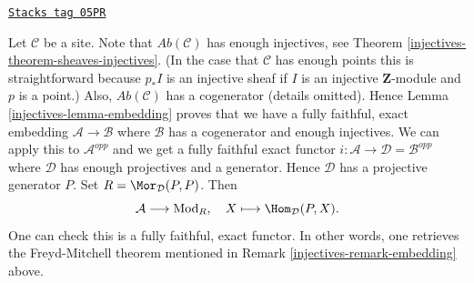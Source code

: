 \begin{remark}
\label{injectives-remark-embedding-freyd}
\href{https://stacks.math.columbia.edu/tag/05PR}{\texttt{Stacks tag 05PR}}

Let $\mathcal{C}$ be a site.
Note that $\textit{Ab}(\mathcal{C})$ has enough injectives, see
Theorem \ref{injectives-theorem-sheaves-injectives}.
(In the case that $\mathcal{C}$ has enough points this is straightforward
because  $p_*I$ is an injective sheaf if $I$ is an injective
$\mathbf{Z}$-module and $p$ is a point.)
Also, $\textit{Ab}(\mathcal{C})$ has a cogenerator (details omitted).
Hence
Lemma \ref{injectives-lemma-embedding}
proves that we have a fully faithful, exact embedding
$\mathcal{A} \to \mathcal{B}$ where $\mathcal{B}$ has a
cogenerator and enough injectives.
We can apply this to $\mathcal{A}^{opp}$ and we get a
fully faithful exact functor
$i : \mathcal{A} \to \mathcal{D} = \mathcal{B}^{opp}$
where $\mathcal{D}$ has enough projectives and a generator. Hence
$\mathcal{D}$ has a projective generator $P$.
Set $R = \Mor_\mathcal{D}(P, P)$. Then
$$
\mathcal{A} \longrightarrow \text{Mod}_R, \quad
X \longmapsto \Hom_\mathcal{D}(P, X).
$$
One can check this is a fully faithful, exact functor.
In other words, one retrieves the
Freyd-Mitchell theorem mentioned in
Remark \ref{injectives-remark-embedding}
above.
\end{remark}

